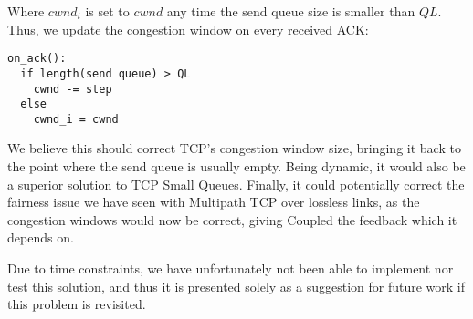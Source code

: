 Where $cwnd_i$ is set to $cwnd$ any time the send queue size is smaller than $QL$.
Thus, we update the congestion window on every received ACK:

\begin{verbatim}
on_ack():
  if length(send queue) > QL
    cwnd -= step
  else
    cwnd_i = cwnd
\end{verbatim}

We believe this should correct TCP's congestion window size, bringing it back to
the point where the send queue is usually empty. Being dynamic, it would also be
a superior solution to TCP Small Queues. Finally, it could potentially correct the fairness
issue we have seen with Multipath TCP over lossless links, as the congestion
windows would now be correct, giving Coupled the feedback which it depends on.

Due to time constraints, we have unfortunately not been able to implement nor test this
solution, and thus it is presented solely as a suggestion for future work if
this problem is revisited.
